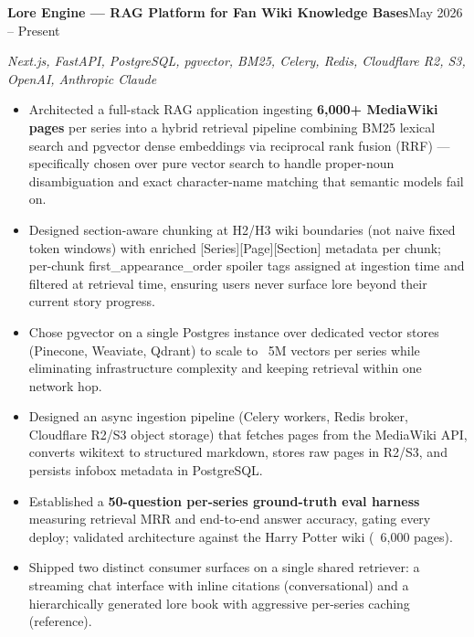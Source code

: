 \documentclass[a4paper,11pt]{article}
\newcommand{\entry}[2]{\noindent\textbf{#1}\hfill{#2}\par}
\newcommand{\subentry}[2]{\noindent\textit{#1}\hfill{\textit{#2}}\par\vspace{2pt}}
\begin{document}
\entry{Lore Engine --- RAG Platform for Fan Wiki Knowledge Bases}{May 2026 -- Present}
\subentry{Next.js, FastAPI, PostgreSQL, pgvector, BM25, Celery, Redis, Cloudflare R2, S3, OpenAI, Anthropic Claude}{}
\begin{itemize}
  \item Architected a full-stack RAG application ingesting \textbf{6,000+ MediaWiki pages} per series into a hybrid retrieval pipeline combining BM25 lexical search and pgvector dense embeddings via reciprocal rank fusion (RRF) --- specifically chosen over pure vector search to handle proper-noun disambiguation and exact character-name matching that semantic models fail on.
  \item Designed section-aware chunking at H2/H3 wiki boundaries (not naive fixed token windows) with enriched [Series][Page][Section] metadata per chunk; per-chunk first\_appearance\_order spoiler tags assigned at ingestion time and filtered at retrieval time, ensuring users never surface lore beyond their current story progress.
  \item Chose pgvector on a single Postgres instance over dedicated vector stores (Pinecone, Weaviate, Qdrant) to scale to ~5M vectors per series while eliminating infrastructure complexity and keeping retrieval within one network hop.
  \item Designed an async ingestion pipeline (Celery workers, Redis broker, Cloudflare R2/S3 object storage) that fetches pages from the MediaWiki API, converts wikitext to structured markdown, stores raw pages in R2/S3, and persists infobox metadata in PostgreSQL.
  \item Established a \textbf{50-question per-series ground-truth eval harness} measuring retrieval MRR and end-to-end answer accuracy, gating every deploy; validated architecture against the Harry Potter wiki (~6,000 pages).
  \item Shipped two distinct consumer surfaces on a single shared retriever: a streaming chat interface with inline citations (conversational) and a hierarchically generated lore book with aggressive per-series caching (reference).
\end{itemize}
\end{document}
